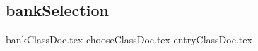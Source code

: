 \subsection{bankSelection}
\label{ss:bankSelection}

{bankClassDoc.tex}
\newpage
{chooseClassDoc.tex}
\newpage
{entryClassDoc.tex}